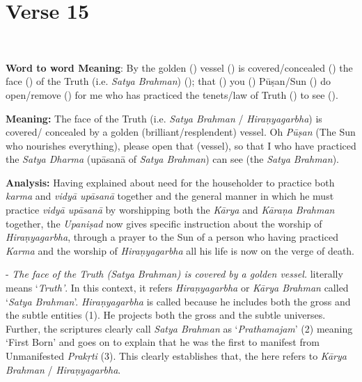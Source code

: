 \chapter{Verse 15}

\begin{moolashloka}
\\
\end{moolashloka}

\textbf{Word to word Meaning}: By the golden () vessel () is covered/concealed () the face () of the Truth (i.e. \emph{Satya Brahman}) (); that () you () Pūṣan/Sun () do open/remove () for me who has practiced the tenets/law of Truth () to see ().

\textbf{Meaning:} The face of the Truth (i.e. \emph{Satya Brahman} / \emph{Hiraṇyagarbha}) is covered/ concealed by a golden (brilliant/resplendent) vessel. Oh \emph{Pūṣan} (The Sun who nourishes everything), please open that (vessel), so that I who have practiced the \emph{Satya Dharma} (upāsanā of \emph{Satya Brahman}) can see (the \emph{Satya Brahman}).

\textbf{Analysis:} Having explained about need for the householder to practice both \emph{karma} and \emph{vidyā upāsanā} together and the general manner in which he must practice \emph{vidyā upāsanā} by worshipping both the \emph{Kārya} and \emph{Kāraṇa} \emph{Brahman} together, the \emph{Upaniṣad} now gives specific instruction about the worship of \emph{Hiraṇyagarbha}, through a prayer to the Sun of a person who having practiced \emph{Karma} and the worship of \emph{Hiraṇyagarbha} all his life is now on the verge of death.

- \emph{The face of the Truth (Satya Brahman) is covered by a golden vessel.}  literally means `\emph{Truth'}. In this context, it refers \emph{Hiraṇyagarbha} or \emph{Kārya Brahman} called `\emph{Satya Brahman}'. \emph{Hiraṇyagarbha} is called  because he includes both the gross and the subtle entities (1). He projects both the gross and the subtle universes. Further, the scriptures clearly call \emph{Satya Brahman} as `\emph{Prathamajam}' (2) meaning `First Born' and goes on to explain that he was the first to manifest from Unmanifested \emph{Prakṛti} (3). This clearly establishes that, the  here refers to \emph{Kārya Brahman} / \emph{Hiraṇyagarbha}.

